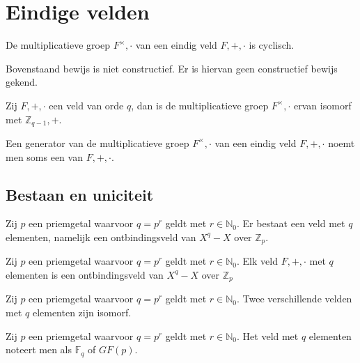 \documentclass[main.tex]{subfiles}
\begin{document}
\section{Eindige velden}
\label{sec:eindige-velden}

\begin{st}
  De multiplicatieve groep $F^{\times},\cdot$ van een eindig veld $F,+,\cdot$ is cyclisch.
\end{st}

\begin{opm}
  Bovenstaand bewijs is niet constructief.
  Er is hiervan geen constructief bewijs gekend.
\end{opm}

\begin{gev}
  Zij $F,+,\cdot$ een veld van orde $q$, dan is de multiplicatieve groep $F^{\times},\cdot$ ervan isomorf met $\mathbb{Z}_{q-1},+$.
\end{gev}

\begin{de}
  Een generator van de multiplicatieve groep $F^{\times},\cdot$ van een eindig veld $F,+,\cdot$ noemt men soms een  van $F,+,\cdot$.
\end{de}

\subsection{Bestaan en uniciteit}
\label{sec:bestaan-en-uniciteit}

\begin{st}
  Zij $p$ een priemgetal waarvoor $q=p^{r}$ geldt met $r\in \mathbb{N}_{0}$.
  Er bestaat een veld met $q$ elementen, namelijk een ontbindingsveld van $X^{q}-X$ over $\mathbb{Z}_{p}$.
\end{st}

\begin{st}
  Zij $p$ een priemgetal waarvoor $q=p^{r}$ geldt met $r\in \mathbb{N}_{0}$.
  Elk veld $F,+,\cdot$ met $q$ elementen is een ontbindingsveld van $X^{q}-X$ over $\mathbb{Z}_p$
\end{st}

\begin{st}
  Zij $p$ een priemgetal waarvoor $q=p^{r}$ geldt met $r\in \mathbb{N}_{0}$.
  Twee verschillende velden met $q$ elementen zijn isomorf.
\end{st}

\begin{de}
  Zij $p$ een priemgetal waarvoor $q=p^{r}$ geldt met $r\in \mathbb{N}_{0}$.
  Het veld met $q$ elementen noteert men als $\mathbb{F}_{q}$ of $GF(p)$.
\end{de}
\end{document}
